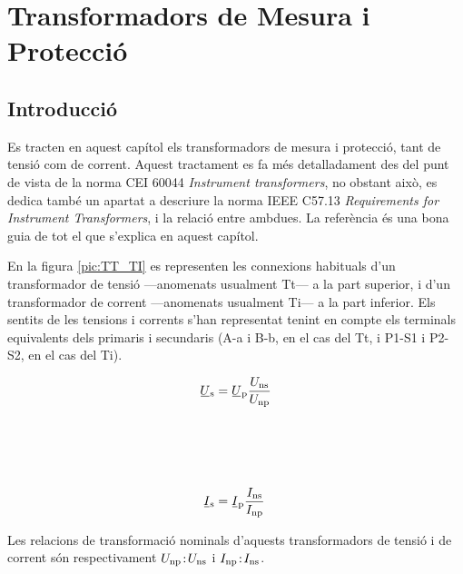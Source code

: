 
\chapter{Transformadors de Mesura i Protecció}\label{sec:tr_mes_prot}


\section{Introducció}
Es tracten en aquest capítol els transformadors de
mesura i  protecció, tant de tensió com de corrent. Aquest
tractament es fa més detalladament des del punt de vista de la norma CEI 60044 \textit{Instrument transformers}, no obstant això, es dedica també un
apartat a descriure la norma  IEEE C57.13 \textit{Requirements for Instrument Transformers}, i la
relació entre ambdues. La referència \cite{KNU} és una bona guia de tot el que s'explica en aquest capítol.

En la figura \vref{pic:TT_TI} es representen les connexions
habituals d'un transformador de tensió ---anomenats usualment Tt---
 a la part superior, i d'un transformador de corrent ---anomenats
usualment Ti--- a la part inferior. Els sentits de les tensions
i corrents s'han representat tenint en compte els terminals
equivalents dels primaris i secundaris (\textsf{A-a} i \textsf{B-b}, en el cas del Tt, i \textsf{P1-S1} i \textsf{P2-S2}, en el cas del Ti).

\hfill
\begin{minipage}[b]{90mm}
    \hspace{1.5cm}
    
    \label{pic:TT_TI}
\end{minipage}
\hfill
\begin{minipage}[b][70mm][t]{50mm}
   \begin{align}
      \cmplx{U}\ped{s} &= \cmplx{U}\ped{p} \frac{U\ped{ns}}{U\ped{np}}
      \\[21mm]
      \cmplx{I}\ped{s} &= \cmplx{I}\ped{p} \frac{I\ped{ns}}{I\ped{np}}
   \end{align}
\end{minipage}

Les relacions de transformació nominals d'aquests transformadors de
tensió i de corrent són respectivament $U_\mathrm{np}\!:\!U_\mathrm{ns}$ i
$I_\mathrm{np}\!:\!I_\mathrm{ns}$.

